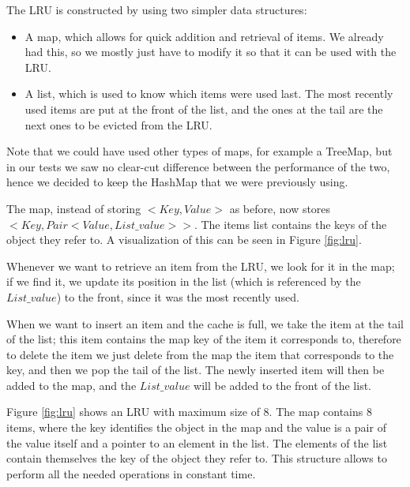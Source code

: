 The LRU is constructed by using two simpler data structures:
\begin{itemize}  
  \item A map, which allows for quick addition and retrieval of items. We already had this, so we mostly just have to modify it so that it can be used with the LRU.
  \item A list, which is used to know which items were used last. The most recently used items are put at the front of the list, and the ones at the tail are the next ones to be evicted from the LRU.
\end{itemize}

Note that we could have used other types of maps, for example a TreeMap, but in our tests we saw no clear-cut difference between the performance of the two, hence we decided to keep the HashMap that we were previously using.

The map, instead of storing $<Key, Value>$ as before, now stores $<Key, Pair<Value, List\_value>>$. The items list contains the keys of the object they refer to. A visualization of this can be seen in Figure \ref{fig:lru}.

Whenever we want to retrieve an item from the LRU, we look for it in the map; if we find it, we update its position in the list (which is referenced by the $List\_value$) to the front, since it was the most recently used.

When we want to insert an item and the cache is full, we take the item at the tail of the list; this item contains the map key of the item it corresponds to, therefore to delete the item we just delete from the map the item that corresponds to the key, and then we pop the tail of the list. 
The newly inserted item will then be added to the map, and the $List\_value$ will be added to the front of the list.

Figure \ref{fig:lru} shows an LRU with maximum size of 8. The map contains 8 items, where the key identifies the object in the map and the value is a pair of the value itself and a pointer to an element in the list. The elements of the list contain themselves the key of the object they refer to. This structure allows to perform all the needed operations in constant time. 

